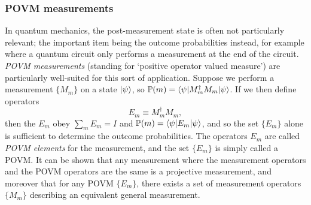 \documentclass[12pt,a4paper]{report}
\numberwithin{equation}{section}
\theoremstyle{definition}
\theoremstyle{theorem}
\theoremstyle{theorem}
\theoremstyle{example}
\theoremstyle{definition}
\begin{document}
\subsubsection{POVM measurements}
In quantum mechanics, the post-measurement state is often not particularly relevant; the important item being the outcome probabilities instead, for example where a quantum circuit only performs a measurement at the end of the circuit. \textit{POVM measurements} (standing for `positive operator valued measure') are particularly well-suited for this sort of application. Suppose we perform a measurement $\{M_{m}\}$ on a state $\ket{\psi}$, so $\mathbb{P}(m)=\braket{\psi|M_{m}^{\dagger}M_{m}|\psi}$. If we then define operators
\begin{equation}
	E_{m}\equiv M_{m}^{\dagger}M_{m},
\end{equation}
then the $E_{m}$ obey $\sum_{m}E_{m}=I$ and $\mathbb{P}(m)=\braket{\psi|E_{m}|\psi}$, and so the set $\{E_{m}\}$ alone is sufficient to determine the outcome probabilities. The operators $E_{m}$ are called \textit{POVM elements} for the measurement, and the set $\{E_{m}\}$ is simply called a POVM. It can be shown that any measurement where the measurement operators and the POVM operators are the same is a projective measurement, and moreover that for any POVM $\{E_{m}\}$, there exists a set of measurement operators $\{M_{m}\}$ describing an equivalent general measurement. 
\end{document}
